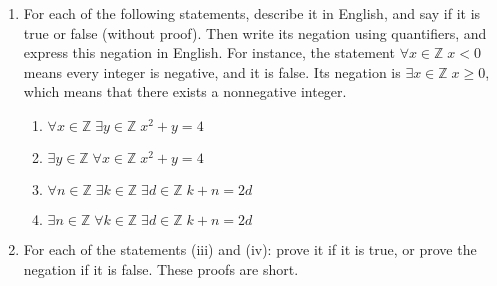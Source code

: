\documentclass{article}
\newcommand{\Z}{\mathbb{Z}}
\theoremstyle{definition}
\begin{document}
\begin{question}
\begin{enumerate}
    \item For each of the following statements, describe it in English, and say if it is true or false (without proof). Then write its negation using quantifiers, and express this negation in English. For instance, the statement $\forall x \in \Z \; x < 0$ means every integer is negative, and it is false. Its negation is $\exists x \in \Z \; x \geq 0$, which means that there exists a nonnegative integer.
	\begin{enumerate}
		\item $\forall x \in \Z \; \exists y \in \Z \; x^2 + y = 4$
		\item $\exists y \in \Z \; \forall x \in \Z \; x^2 + y = 4$
		\item $\forall n \in \Z \; \exists k \in \Z \; \exists d \in \Z \; k+ n = 2d$
		\item $\exists n \in \Z \; \forall k \in \Z \; \exists d \in \Z \; k+ n = 2d$
	\end{enumerate}
	\item For each of the statements (iii) and (iv): prove it if it is true, or prove the negation if it is false. These proofs are short.
\end{enumerate}
\end{question}
\end{document}

